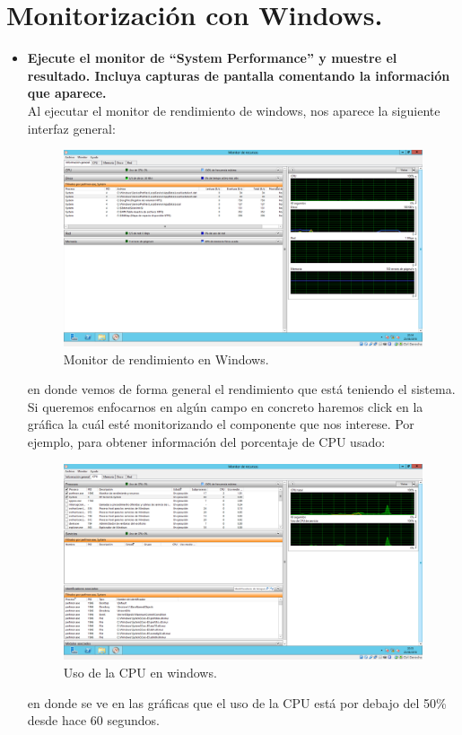 \section{Monitorización con Windows.}
\begin{itemize}
		\item \textbf{Ejecute el monitor de “System Performance” y muestre el resultado. Incluya capturas de pantalla comentando la información que aparece.}\\
		Al ejecutar el monitor de rendimiento de windows, nos aparece la siguiente interfaz general:\\
		
		\begin{figure}[H]
		\centering
		\includegraphics[width=0.6\linewidth]{WindowsCPU}
		\caption[WindowsMonitor]{Monitor de rendimiento en Windows.}
		\label{fig:Profiling_windows}
		\end{figure}
		
		en donde vemos de forma general el rendimiento que está teniendo el sistema. Si queremos enfocarnos en algún campo en concreto haremos click en la gráfica la cuál esté monitorizando el componente que nos interese. Por ejemplo, para obtener información del porcentaje de CPU usado:\\
		
		\begin{figure}[H]
		\centering
		\includegraphics[width=0.6\linewidth]{WindowsCPU2}
		\caption[WindowsCPU]{Uso de la CPU en windows.}
		\label{fig:WindowsCPU}
		\end{figure}
		
		en donde se ve en las gráficas que el uso de la CPU está por debajo del 50\% desde hace 60 segundos.\\
		

\end{itemize}
